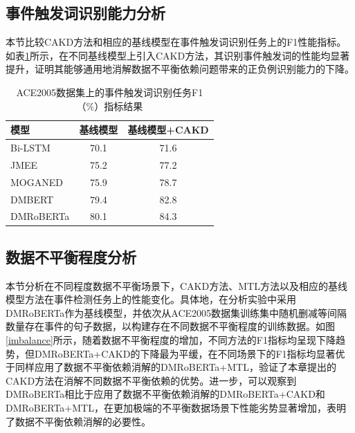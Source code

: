 \subsection{事件触发词识别能力分析}

本节比较CAKD方法和相应的基线模型在事件触发词识别任务上的F1性能指标。如表\ref{tab:identification_compare}所示，在不同基线模型上引入CAKD方法，其识别事件触发词的性能均显著提升，证明其能够通用地消解数据不平衡依赖问题带来的正负例识别能力的下降。

\begin{table}[htp]
    \centering
    \caption{ACE2005数据集上的事件触发词识别任务F1（\%）指标结果}
	\begin{tabular}{lcc}
	    \toprule
		模型  & 基线模型  & 基线模型+CAKD   \\
		\midrule
		Bi-LSTM   & 70.1  & 71.6      \\
		JMEE      & 75.2  &  77.2        \\
		MOGANED   & 75.9  & 78.7    \\
            DMBERT   &  79.4 &  82.8   \\
            DMRoBERTa   &  80.1 &  84.3   \\   
		\bottomrule
	\end{tabular}
	\label{tab:identification_compare}
\end{table}

\subsection{数据不平衡程度分析}

本节分析在不同程度数据不平衡场景下，CAKD方法、MTL方法以及相应的基线模型方法在事件检测任务上的性能变化。具体地，在分析实验中采用DMRoBERTa作为基线模型，并依次从ACE2005数据集训练集中随机删减等间隔数量存在事件的句子数据，以构建存在不同数据不平衡程度的训练数据。如图\ref{imbalance}所示，随着数据不平衡程度的增加，不同方法的F1指标均呈现下降趋势，但DMRoBERTa+CAKD的下降最为平缓，在不同场景下的F1指标均显著优于同样应用了数据不平衡依赖消解的DMRoBERTa+MTL，验证了本章提出的CAKD方法在消解不同数据不平衡依赖的优势。进一步，可以观察到DMRoBERTa相比于应用了数据不平衡依赖消解的DMRoBERTa+CAKD和DMRoBERTa+MTL，在更加极端的不平衡数据场景下性能劣势显著增加，表明了数据不平衡依赖消解的必要性。

